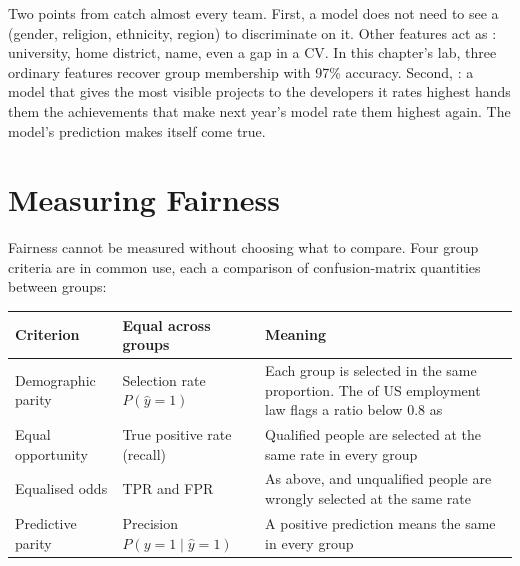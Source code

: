 Two points from  catch almost every team. First, a model does not
need to see a  (gender, religion, ethnicity, region) to
discriminate on it. Other features act as : university, home
district, name, even a gap in a CV. In this chapter's lab, three ordinary features
recover group membership with 97\% accuracy. Second, : a model
that gives the most visible projects to the developers it rates highest hands them the
achievements that make next year's model rate them highest again. The model's
prediction makes itself come true.

\section{Measuring Fairness}

Fairness cannot be measured without choosing what to compare. Four group criteria
are in common use, each a comparison of confusion-matrix quantities between groups:

\begin{longtable}{@{}L{3.3cm}L{4.6cm}L{7.1cm}@{}}
\toprule
{}
\textbf{Criterion} & \textbf{Equal across groups} & \textbf{Meaning} \\
\midrule
\endhead
Demographic parity & Selection rate $P(\hat{y} = 1)$ & Each group is selected in the same
proportion. The  of US employment law flags a ratio below 0.8 as
 \\
Equal opportunity & True positive rate (recall) & Qualified people are selected at the
same rate in every group \\
Equalised odds & TPR and FPR & As above, and unqualified people are wrongly selected at
the same rate \\
Predictive parity & Precision $P(y = 1 \mid \hat{y} = 1)$ & A positive prediction means
the same in every group \\
\bottomrule
\end{longtable}

